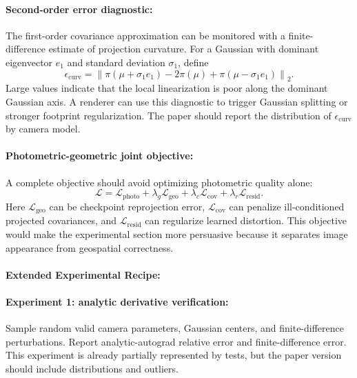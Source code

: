 \documentclass{article}
\begin{document}
\paragraph{Second-order error diagnostic:}

The first-order covariance approximation can be monitored with a finite-difference estimate of projection curvature. For a Gaussian with dominant eigenvector $e_1$ and standard deviation $\sigma_1$, define
\begin{equation}
  \epsilon_{\text{curv}} =
  \left\|\pi(\mu+\sigma_1e_1)-2\pi(\mu)+\pi(\mu-\sigma_1e_1)\right\|_2.
\end{equation}
Large values indicate that the local linearization is poor along the dominant Gaussian axis. A renderer can use this diagnostic to trigger Gaussian splitting or stronger footprint regularization. The paper should report the distribution of $\epsilon_{\text{curv}}$ by camera model.

\paragraph{Photometric-geometric joint objective:}

A complete objective should avoid optimizing photometric quality alone:
\begin{equation}
  \mathcal{L} =
  \mathcal{L}_{\text{photo}}+
  \lambda_g\mathcal{L}_{\text{geo}}+
  \lambda_c\mathcal{L}_{\text{cov}}+
  \lambda_r\mathcal{L}_{\text{resid}}.
\end{equation}
Here $\mathcal{L}_{\text{geo}}$ can be checkpoint reprojection error, $\mathcal{L}_{\text{cov}}$ can penalize ill-conditioned projected covariances, and $\mathcal{L}_{\text{resid}}$ can regularize learned distortion. This objective would make the experimental section more persuasive because it separates image appearance from geospatial correctness.

\paragraph{Extended Experimental Recipe:}

\paragraph{Experiment 1: analytic derivative verification:}

Sample random valid camera parameters, Gaussian centers, and finite-difference perturbations. Report analytic-autograd relative error and finite-difference error. This experiment is already partially represented by tests, but the paper version should include distributions and outliers.
\end{document}
